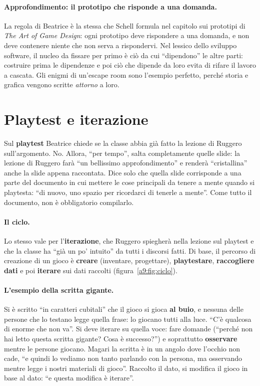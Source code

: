 \paragraph{Approfondimento: il prototipo che risponde a una domanda.} La regola di
Beatrice è la stessa che Schell formula nel capitolo sui prototipi di \emph{The Art
of Game Design}: ogni prototipo deve rispondere a una domanda, e non deve contenere
niente che non serva a rispondervi. Nel lessico dello sviluppo software, il nucleo
da fissare per primo è ciò da cui ``dipendono'' le altre parti: costruire prima le
dipendenze e poi ciò che dipende da loro evita di rifare il lavoro a cascata. Gli
enigmi di un'escape room sono l'esempio perfetto, perché storia e grafica vengono
scritte \emph{attorno} a loro.

\section{Playtest e iterazione}
\label{a9:sec:iterare}

Sul \textbf{playtest} Beatrice chiede se la classe abbia già fatto la lezione di
Ruggero sull'argomento. No. Allora, ``per tempo'', salta completamente quelle slide:
la lezione di Ruggero farà ``un bellissimo approfondimento'' e renderà
``cristallina'' anche la slide appena raccontata. Dice solo che quella slide
corrisponde a una parte del documento in cui mettere le cose principali da tenere a
mente quando si playtesta: ``di nuovo, uno spazio per ricordarci di tenerle a mente''.
Come tutto il documento, non è obbligatorio compilarlo.

\paragraph{Il ciclo.} Lo stesso vale per l'\textbf{iterazione}, che Ruggero
spiegherà nella lezione sul playtest e che la classe ha ``già un po' intuito'' da
tutti i discorsi fatti. Di base, il percorso di creazione di un gioco è
\textbf{creare} (inventare, progettare), \textbf{playtestare}, \textbf{raccogliere
dati} e poi \textbf{iterare} sui dati raccolti (figura~\ref{a9:fig:ciclo}).

\paragraph{L'esempio della scritta gigante.} Si è scritto ``in caratteri cubitali''
che il gioco si gioca \textbf{al buio}, e nessuna delle persone che lo testano legge
quella frase: lo giocano tutti alla luce. ``C'è qualcosa di enorme che non va''. Si
deve iterare su quella voce: fare domande (``perché non hai letto questa scritta
gigante? Cosa è successo?'') e soprattutto \textbf{osservare} mentre le persone
giocano. Magari la scritta è in un angolo dove l'occhio non cade, ``e quindi lo
vediamo non tanto parlando con la persona, ma osservando mentre legge i nostri
materiali di gioco''. Raccolto il dato, si modifica il gioco in base al dato: ``e
questa modifica è iterare''.

